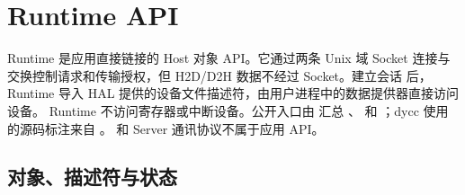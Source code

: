 \documentclass[../dayan_api_reference.tex]{subfiles}
\begin{document}
\section{Runtime API}\label{sec:api-runtime}

Runtime 是应用直接链接的 Host 对象 API。它通过两条 Unix 域 Socket 连接与
 交换控制请求和传输授权，但 H2D/D2H 数据不经过 Socket。建立会话
后，Runtime 导入 HAL 提供的设备文件描述符，由用户进程中的数据提供器直接访问设备。
Runtime 不访问寄存器或中断设备。公开入口由
 汇总 、 和
；dycc 使用的源码标注来自 。
 和 Server 通讯协议不属于应用 API。

\subsection{对象、描述符与状态}
\end{document}

